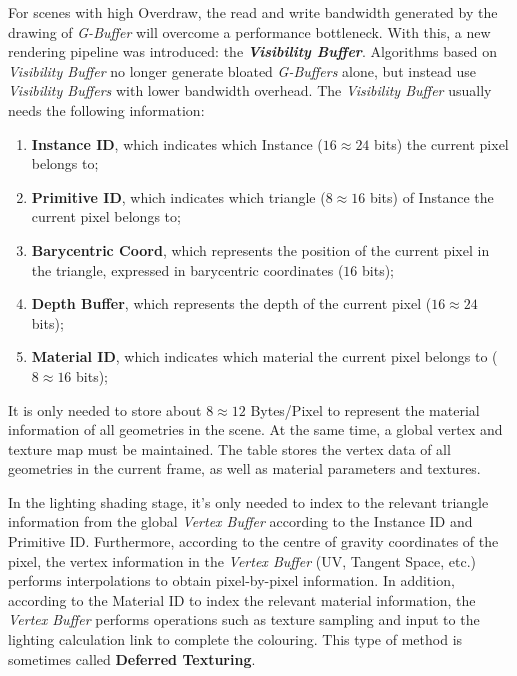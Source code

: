 \documentclass[10pt,journal,compsoc]{IEEEtran}
\begin{document}
\par For scenes with high Overdraw, the read and write bandwidth generated by the drawing of \textit{G-Buffer} will overcome a performance bottleneck. With this, a new rendering pipeline was introduced: the \textbf{\textit{Visibility Buffer}}. Algorithms based on \textit{Visibility Buffer} no longer generate bloated \textit{G-Buffers} alone, but instead use \textit{Visibility Buffers} with lower bandwidth overhead. The \textit{Visibility Buffer} usually needs the following information:

\begin{enumerate}
    \item \textbf{Instance ID}, which indicates which Instance ($16\approx24$ bits) the current pixel belongs to;
    \item \textbf{Primitive ID}, which indicates which triangle ($8\approx16$ bits) of Instance the current pixel belongs to;
    \item \textbf{Barycentric Coord}, which represents the position of the current pixel in the triangle, expressed in barycentric coordinates ($16$ bits);
    \item \textbf{Depth Buffer}, which represents the depth of the current pixel ($16\approx24$ bits);
    \item \textbf{Material ID}, which indicates which material the current pixel belongs to ($8\approx16$ bits);
\end{enumerate}

\par It is only needed to store about $8\approx12$ Bytes/Pixel to represent the material information of all geometries in the scene. At the same time, a global vertex and texture map must be maintained. The table stores the vertex data of all geometries in the current frame, as well as material parameters and textures.

\par In the lighting shading stage, it's only needed to index to the relevant triangle information from the global \textit{Vertex Buffer} according to the Instance ID and Primitive ID. Furthermore, according to the centre of gravity coordinates of the pixel, the vertex information in the \textit{Vertex Buffer} (UV, Tangent Space, etc.) performs interpolations to obtain pixel-by-pixel information. In addition, according to the Material ID to index the relevant material information, the \textit{Vertex Buffer} performs operations such as texture sampling and input to the lighting calculation link to complete the colouring. This type of method is sometimes called \textbf{Deferred Texturing}.
\end{document}
